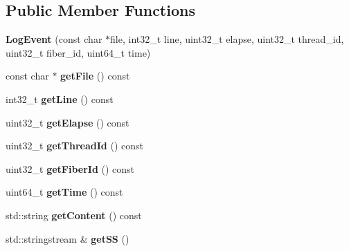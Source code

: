 \subsection*{Public Member Functions}
\begin{DoxyCompactItemize}
\item 
\hypertarget{classsylar_1_1LogEvent_ab074c368ef63bf599b660b15c10894d0}{{\bfseries Log\-Event} (const char $\ast$file, int32\-\_\-t line, uint32\-\_\-t elapse, uint32\-\_\-t thread\-\_\-id, uint32\-\_\-t fiber\-\_\-id, uint64\-\_\-t time)}\label{classsylar_1_1LogEvent_ab074c368ef63bf599b660b15c10894d0}

\item 
\hypertarget{classsylar_1_1LogEvent_a2f5e9a69ee10eeb0d6b3154a6a9166fe}{const char $\ast$ {\bfseries get\-File} () const }\label{classsylar_1_1LogEvent_a2f5e9a69ee10eeb0d6b3154a6a9166fe}

\item 
\hypertarget{classsylar_1_1LogEvent_ac940f5f44ab4116d00721001d5ecc44d}{int32\-\_\-t {\bfseries get\-Line} () const }\label{classsylar_1_1LogEvent_ac940f5f44ab4116d00721001d5ecc44d}

\item 
\hypertarget{classsylar_1_1LogEvent_a449808c6ac645bde7f0cf71c6e5cc114}{uint32\-\_\-t {\bfseries get\-Elapse} () const }\label{classsylar_1_1LogEvent_a449808c6ac645bde7f0cf71c6e5cc114}

\item 
\hypertarget{classsylar_1_1LogEvent_a212c222ba2dabf5ec3dd1b3a7023afc3}{uint32\-\_\-t {\bfseries get\-Thread\-Id} () const }\label{classsylar_1_1LogEvent_a212c222ba2dabf5ec3dd1b3a7023afc3}

\item 
\hypertarget{classsylar_1_1LogEvent_ac20af0480592e6f66bd3ead4124a5fcf}{uint32\-\_\-t {\bfseries get\-Fiber\-Id} () const }\label{classsylar_1_1LogEvent_ac20af0480592e6f66bd3ead4124a5fcf}

\item 
\hypertarget{classsylar_1_1LogEvent_aa43a37b13a34ad30e8a96925f14df3a1}{uint64\-\_\-t {\bfseries get\-Time} () const }\label{classsylar_1_1LogEvent_aa43a37b13a34ad30e8a96925f14df3a1}

\item 
\hypertarget{classsylar_1_1LogEvent_afd990cc039097dac257cfe75b25bed73}{std\-::string {\bfseries get\-Content} () const }\label{classsylar_1_1LogEvent_afd990cc039097dac257cfe75b25bed73}

\item 
\hypertarget{classsylar_1_1LogEvent_af67850c4ccc3250ca62bae0b4371ca70}{std\-::stringstream \& {\bfseries get\-S\-S} ()}\label{classsylar_1_1LogEvent_af67850c4ccc3250ca62bae0b4371ca70}

\end{DoxyCompactItemize}
